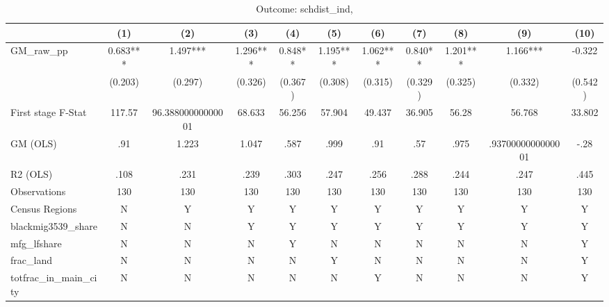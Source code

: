 \begin{table}[htbp]\centering
\def\sym#1{\ifmmode^{#1}\else\(^{#1}\)\fi}
\caption{Outcome: schdist\_ind, }
\begin{tabular}{l*{10}{c}}
\toprule
            &\multicolumn{1}{c}{(1)}   &\multicolumn{1}{c}{(2)}   &\multicolumn{1}{c}{(3)}   &\multicolumn{1}{c}{(4)}   &\multicolumn{1}{c}{(5)}   &\multicolumn{1}{c}{(6)}   &\multicolumn{1}{c}{(7)}   &\multicolumn{1}{c}{(8)}   &\multicolumn{1}{c}{(9)}   &\multicolumn{1}{c}{(10)}   \\
\midrule
GM\_raw\_pp   &     0.683***&     1.497***&     1.296***&     0.848** &     1.195***&     1.062***&     0.840** &     1.201***&     1.166***&    -0.322   \\
            &   (0.203)   &   (0.297)   &   (0.326)   &   (0.367)   &   (0.308)   &   (0.315)   &   (0.329)   &   (0.325)   &   (0.332)   &   (0.542)   \\
\midrule
First stage F-Stat&    117.57   &96.38800000000001   &    68.633   &    56.256   &    57.904   &    49.437   &    36.905   &     56.28   &    56.768   &    33.802   \\
GM (OLS)    &       .91   &     1.223   &     1.047   &      .587   &      .999   &       .91   &       .57   &      .975   &.9370000000000001   &      -.28   \\
R2 (OLS)    &      .108   &      .231   &      .239   &      .303   &      .247   &      .256   &      .288   &      .244   &      .247   &      .445   \\
Observations&       130   &       130   &       130   &       130   &       130   &       130   &       130   &       130   &       130   &       130   \\
Census Regions&         N   &         Y   &         Y   &         Y   &         Y   &         Y   &         Y   &         Y   &         Y   &         Y   \\
blackmig3539\_share&         N   &         N   &         Y   &         Y   &         Y   &         Y   &         Y   &         Y   &         Y   &         Y   \\
mfg\_lfshare &         N   &         N   &         N   &         Y   &         N   &         N   &         N   &         N   &         N   &         Y   \\
frac\_land   &         N   &         N   &         N   &         N   &         Y   &         N   &         N   &         N   &         N   &         Y   \\
totfrac\_in\_main\_city&         N   &         N   &         N   &         N   &         N   &         Y   &         N   &         N   &         N   &         Y   \\

\end{tabular}
\end{table}
